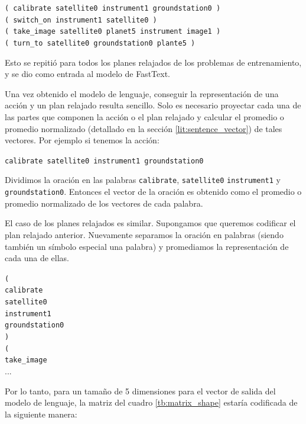 \begin{center}
    \verb|( calibrate satellite0 instrument1 groundstation0 )| \\
    \verb|( switch_on instrument1 satellite0 )| \\
    \verb|( take_image satellite0 planet5 instrument image1 )| \\
    \verb|( turn_to satellite0 groundstation0 plante5 )|
\end{center}

Esto se repitió para todos los planes relajados de los problemas de
entrenamiento, y se dio como entrada al modelo de FastText.

Una vez obtenido el modelo de lenguaje, conseguir la representación de una
acción y un plan relajado resulta sencillo. Solo es necesario proyectar cada una
de las partes que componen la acción o el plan relajado y calcular el promedio o
promedio normalizado (detallado en la sección \ref{lit:sentence_vector}) de
tales vectores. Por ejemplo si tenemos la acción:

\begin{center}
    \verb|calibrate satellite0 instrument1 groundstation0|    
\end{center}

Dividimos la oración en las palabras \verb|calibrate|,  \verb|satellite0|
\verb|instrument1| y \verb|groundstation0|. Entonces el vector de la oración es
obtenido como el promedio o promedio normalizado de los vectores de cada
palabra.

El caso de los planes relajados es similar. Supongamos que queremos codificar el
plan relajado anterior. Nuevamente separamos la oración en palabras (siendo
también un símbolo especial una palabra) y promediamos la representación de cada
una de ellas.

\begin{center}
\verb|(| \\
\verb|calibrate| \\
\verb|satellite0| \\
\verb|instrument1| \\
\verb|groundstation0| \\
\verb|)| \\
\verb|(| \\
\verb|take_image| \\
...
\end{center}

Por lo tanto, para un tamaño de 5 dimensiones para el vector de salida del
modelo de lenguaje, la matriz del cuadro \ref{tb:matrix_shape} estaría
codificada de la siguiente manera:

